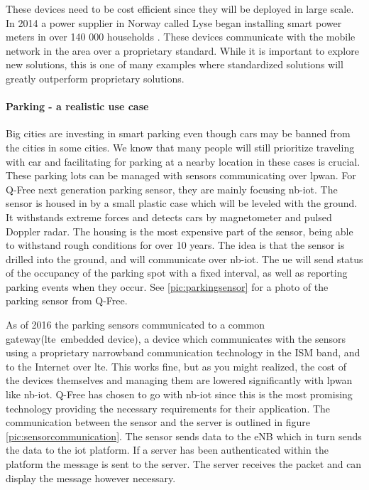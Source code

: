 \documentclass[USenglish]{ifimaster}  %
\begin{document}
These devices need to be cost efficient since they will be deployed in large scale. In 2014 a power supplier in Norway called Lyse began installing smart power meters in over 140 000 households \cite{online:lyseAMS}. These devices communicate with the mobile network in the area over a proprietary standard. While it is important to explore new solutions, this is one of many examples where standardized solutions will greatly outperform proprietary solutions.

\paragraph{Parking - a realistic use case} \label{paragraph:sensoroutline}
Big cities are investing in smart parking even though cars may be banned from the cities in some cities. We know that many people will still prioritize traveling with car and facilitating for parking at a nearby location in these cases is crucial. These parking lots can be managed with sensors communicating over \acrshort{lpwan}. For Q-Free next generation parking sensor, they are mainly focusing \acrshort{nb-iot}. The sensor is housed in by a small plastic case which will be leveled with the ground. It withstands extreme forces and detects cars by magnetometer and pulsed Doppler radar. The housing is the most expensive part of the sensor, being able to withstand rough conditions for over 10 years. The idea is that the sensor is drilled into the ground, and will communicate over \acrshort{nb-iot}. The \acrshort{ue} will send status of the occupancy of the parking spot with a fixed interval, as well as reporting parking events when they occur. See \ref{pic:parkingsensor} for a photo of the parking sensor from Q-Free.

As of 2016 the parking sensors communicated to a common gateway(\acrshort{lte} embedded device), a device which communicates with the sensors using a proprietary narrowband communication technology in the ISM band, and to the Internet over \acrshort{lte}. This works fine, but as you might realized, the cost of the devices themselves and managing them are lowered significantly with \acrshort{lpwan} like \acrshort{nb-iot}. Q-Free has chosen to go with \acrshort{nb-iot} since this is the most promising technology providing the necessary requirements for their application. The communication between the sensor and the server is outlined in figure \vref{pic:sensorcommunication}. The sensor sends data to the eNB which in turn sends the data to the \acrshort{iot} platform. If a server has been authenticated within the platform the message is sent to the server. The server receives the packet and can display the message however necessary.
\end{document}
